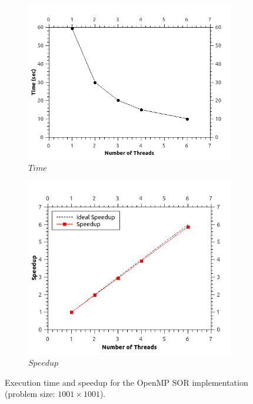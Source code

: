 \documentclass[11pt]{report}
\begin{document}
\begin{figure}[th!]
\centering
\begin{subfigure}{0.45\textwidth}
  \centering
  \includegraphics[width=1.0\linewidth]{images/sor_time_1001}
  \caption{$Time$}
\end{subfigure}
\begin{subfigure}{0.45\textwidth}
  \centering
  \includegraphics[width=1.0\linewidth]{images/sor_speedup_1001}
  \caption{$Speedup$}
\end{subfigure}
\caption{Execution time and speedup for the OpenMP SOR implementation (problem size: $1001 \times 1001$). }
\label{fig:example5.8}
\end{figure}
\end{document}
